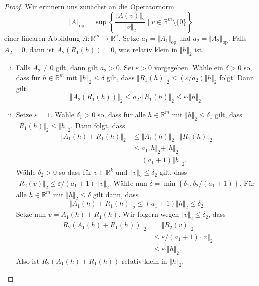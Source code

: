 \documentclass[../main.tex]{subfiles}
\begin{document}
\begin{proof}
  Wir erinnern uns zunächst an die Operatornorm
  \[
    \Vert A \Vert_{\text{op}} =
    \sup \left\{\frac{\Vert A(v) \Vert_2}{\Vert v \Vert_2}
    \mid v \in \mathbb{R}^m \setminus \{0\} \right\}
  \]
  einer linearen Abbildung $A \colon \mathbb{R}^m \to \mathbb{R}^n$.
  Setze $a_1 = \Vert A_1 \Vert_{\text{op}}$ und 
  $a_2 = \Vert A_2 \Vert_{\text{op}}$.
  Falls $A_2 = 0$, dann ist $A_2(R_1(h)) = 0$, was
  relativ klein in $\Vert h \Vert_2$ ist.
  \begin{enumerate}[(i)]
    \item 
      Falls $A_2 \neq 0$ gilt, dann gilt $a_2 > 0$.
      Sei $\varepsilon > 0$ vorgegeben. Wähle ein
      $\delta > 0$ so, dass
      für $h \in \mathbb{R}^m$ mit $\Vert h \Vert_2 \leq \delta$ gilt,
      dass $\Vert R_1(h)\Vert_2 \leq (\varepsilon / a_2) \Vert h \Vert_2$ folgt.
      Dann gilt
      \[
        \Vert A_2(R_1(h)) \Vert_2 \leq a_2 \cdot \Vert R_1(h) \Vert_2
        \leq \varepsilon \cdot \Vert h \Vert_2.
      \]
    \item 
      Setze $\varepsilon = 1$.%
      Wähle $\delta_1 > 0$ so, dass für alle
      $h \in \mathbb{R}^m$ mit $\Vert h \Vert_2 \leq \delta_1$ 
      gilt, dass $\Vert R_1(h) \Vert_2 \leq \Vert h \Vert_2$.
      Dann folgt, dass
      \begin{align*}
        \Vert A_1(h) + R_1(h) \Vert_2 
        &\leq \Vert A_1(h) \Vert_2 + \Vert R_1(h) \Vert_2  \\
        &\leq a_1 \Vert h \Vert_2 + \Vert h \Vert_2 \\
        &= (a_1 + 1) \Vert h \Vert_2.
      \end{align*}
      Wähle $\delta_2 > 0$ so dass für
      $v \in \mathbb{R}^k$ 
      und $\Vert v \Vert_2 \leq \delta_2$ gilt,
      dass
      $\Vert R_2(v) \Vert_2 \leq \varepsilon/(a_1 + 1) \cdot \Vert v \Vert_2$.
      Wähle nun $\delta = \min \left\{\delta_1,
      \delta_2 / (a_1 + 1) \right\}$.
      Für alle $h \in \mathbb{R}^m$ mit
      $\Vert h \Vert_2 \leq \delta$ gilt dann, dass
      \[
        \Vert A_1(h) + R_1(h) \Vert_2
         \leq (a_1 + 1) \Vert h \Vert_2 \leq \delta_2
      \]
      Setze nun $v = A_1(h) + R_1(h)$.
      Wir folgern wegen $\Vert v \Vert_2 \leq \delta_2$, dass
      \begin{align*}
        \Vert R_2(A_1(h) + R_1(h)) \Vert_2 
        & = \Vert R_2(v) \Vert_2  \\
        &\leq \varepsilon / (a_1 + 1) \cdot \Vert v \Vert_2 \\
        &\leq \varepsilon \cdot \Vert h \Vert_2.
      \end{align*}
      Also ist $R_2(A_1(h) + R_1(h))$ relativ klein
      in $\Vert h \Vert_2$. \qedhere
  \end{enumerate}
\end{proof}
\end{document}
